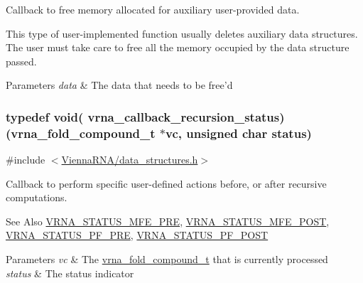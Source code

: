 Callback to free memory allocated for auxiliary user-\/provided data. 

This type of user-\/implemented function usually deletes auxiliary data structures. The user must take care to free all the memory occupied by the data structure passed.


\begin{DoxyParams}{Parameters}
{\em data} & The data that needs to be free'd \\
\hline
\end{DoxyParams}
\hypertarget{group__fold__compound_ga9fafb3f0217e27339bb9faf61a03e723}{
\subsubsection[{vrna\-\_\-callback\-\_\-recursion\-\_\-status}]{\setlength{\rightskip}{0pt plus 5cm}typedef void( vrna\-\_\-callback\-\_\-recursion\-\_\-status)({\bf vrna\-\_\-fold\-\_\-compound\-\_\-t} $\ast$vc, unsigned char status)}}\label{group__fold__compound_ga9fafb3f0217e27339bb9faf61a03e723}


{\ttfamily \#include $<$\hyperlink{data__structures_8h}{Vienna\-R\-N\-A/data\-\_\-structures.\-h}$>$}



Callback to perform specific user-\/defined actions before, or after recursive computations. 

\begin{DoxySeeAlso}{See Also}
\hyperlink{group__fold__compound_ga1a5053dc8acbb0111e852988726f07d6}{V\-R\-N\-A\-\_\-\-S\-T\-A\-T\-U\-S\-\_\-\-M\-F\-E\-\_\-\-P\-R\-E}, \hyperlink{group__fold__compound_ga47c900ca76e56e59e2e83a06e0bde641}{V\-R\-N\-A\-\_\-\-S\-T\-A\-T\-U\-S\-\_\-\-M\-F\-E\-\_\-\-P\-O\-S\-T}, \hyperlink{group__fold__compound_ga91795d35ebdb6f32be50459f24b3d114}{V\-R\-N\-A\-\_\-\-S\-T\-A\-T\-U\-S\-\_\-\-P\-F\-\_\-\-P\-R\-E}, \hyperlink{group__fold__compound_ga1c6fa243533fd026e50f7d595eaaa565}{V\-R\-N\-A\-\_\-\-S\-T\-A\-T\-U\-S\-\_\-\-P\-F\-\_\-\-P\-O\-S\-T} 
\end{DoxySeeAlso}

\begin{DoxyParams}{Parameters}
{\em vc} & The \hyperlink{group__fold__compound_ga1b0cef17fd40466cef5968eaeeff6166}{vrna\-\_\-fold\-\_\-compound\-\_\-t} that is currently processed \\
\hline
{\em status} & The status indicator \\
\hline
\end{DoxyParams}


